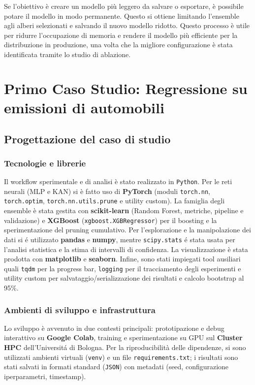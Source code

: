 \documentclass[a4paper,12pt]{report}
\begin{document}
	Se l'obiettivo è creare un modello più leggero da salvare o esportare, è possibile potare il modello in modo permanente. Questo si ottiene limitando l'ensemble agli alberi selezionati e salvando il nuovo modello ridotto. Questo processo è utile per ridurre l'occupazione di memoria e rendere il modello più efficiente per la distribuzione in produzione, una volta che la migliore configurazione è stata identificata tramite lo studio di ablazione.
	
	\chapter{Primo Caso Studio: Regressione su emissioni di automobili}
	
	\section{Progettazione del caso di studio}
	
	\subsection{Tecnologie e librerie}
	Il workflow sperimentale e di analisi è stato realizzato in \texttt{Python}. Per le reti neurali (MLP e KAN) si è fatto uso di \textbf{PyTorch} (moduli \texttt{torch.nn}, \texttt{torch.optim}, \texttt{torch.nn.utils.prune} e utility custom). La famiglia degli ensemble è stata gestita con \textbf{scikit-learn} (Random Forest, metriche, pipeline e validazione) e \textbf{XGBoost} (\texttt{xgboost.XGBRegressor}) per il boosting e la sperimentazione del pruning cumulativo. Per l'esplorazione e la manipolazione dei dati si é utilizzato \textbf{pandas} e \textbf{numpy}, mentre \texttt{scipy.stats} é stata usata per l'analisi statistica e la stima di intervalli di confidenza. La visualizzazione è stata prodotta con \textbf{matplotlib} e \textbf{seaborn}. Infine, sono stati impiegati tool ausiliari quali \texttt{tqdm} per la progress bar, \texttt{logging} per il tracciamento degli esperimenti e utility custom per salvataggio/serializzazione dei risultati e calcolo bootstrap al 95\%.
	
	\subsection{Ambienti di sviluppo e infrastruttura}
	Lo sviluppo è avvenuto in due contesti principali: prototipazione e debug interattivo su \textbf{Google Colab}, training e sperimentazione su GPU sul \textbf{Cluster HPC} dell'Universitá di Bologna. Per la riproducibilità delle dipendenze, si sono utilizzati ambienti virtuali (\texttt{venv}) e un file \texttt{requirements.txt}; i risultati sono stati salvati in formati standard (\texttt{JSON}) con metadati (seed, configurazione iperparametri, timestamp).
	
\end{document}
